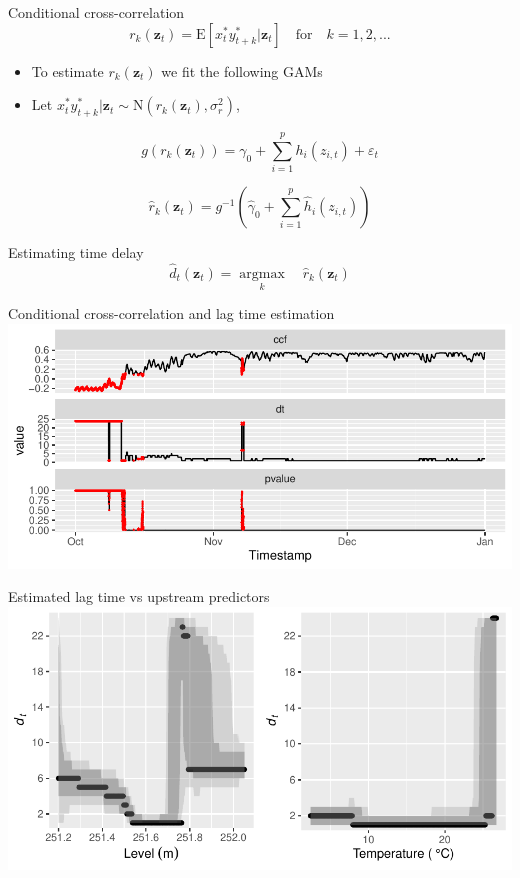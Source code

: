 \documentclass[14pt,ignorenonframetext,compress]{beamer}
\begin{document}
\begin{frame}
\begin{block}{Conditional cross-correlation}
\protect\hypertarget{conditional-cross-correlation}{}
\[
r_k(\bm{z}_t) = \text{E}[x_t^*y^*_{t+k}|\bm{z}_t] \quad \text{for} \quad k = 1,2,...
\]

\begin{itemize}
\item
  To estimate \(r_k(\bm{z}_t)\) we fit the following GAMs
\item
  Let
  \(x_t^*y^*_{t+k}|\bm{z}_t \sim \text{N}(r_k(\bm{z}_t), \sigma_r^2)\),
\end{itemize}

\[
g(r_k(\bm{z}_t)) = \gamma_0 + \sum_{i=1}^p h_i(z_{i,t}) + \varepsilon_t
\]

\[
\hat{r}_k(\bm{z}_t) = g^{-1}( \hat{\gamma}_0 + \sum_{i=1}^p \hat{h}_i(z_{i,t}))
\]
\end{block}

\begin{block}{Estimating time delay}
\protect\hypertarget{estimating-time-delay}{}
\[
\hat{d}_{t}(\bm{z}_t) = \underset{k}{\operatorname{argmax}}\quad \hat{r}_{k}(\bm{z}_t)
\]
\end{block}
\end{frame}

\begin{frame}{Conditional cross-correlation and lag time estimation}
\protect\hypertarget{conditional-cross-correlation-and-lag-time-estimation}{}
\includegraphics[width=1\linewidth]{plots/plot_ccf_dt_pval}
\end{frame}

\begin{frame}{Estimated lag time vs upstream predictors}
\protect\hypertarget{estimated-lag-time-vs-upstream-predictors}{}
\includegraphics[width=1\linewidth]{plots/vis_dt}
\end{frame}
\end{document}
